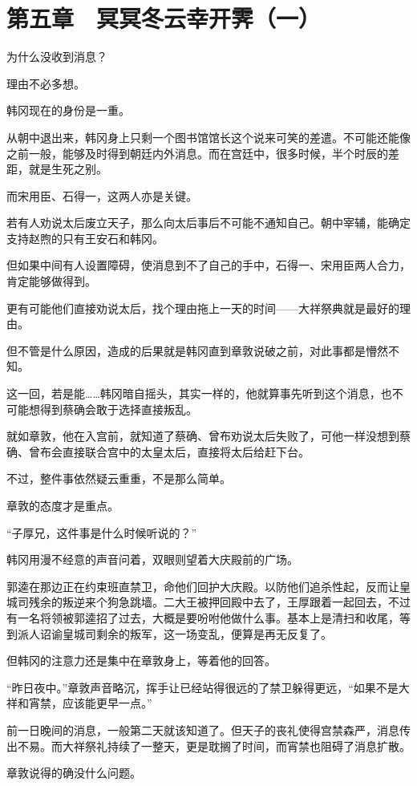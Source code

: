 \section{第五章　冥冥冬云幸开霁（一）}

为什么没收到消息？

理由不必多想。

韩冈现在的身份是一重。

从朝中退出来，韩冈身上只剩一个图书馆馆长这个说来可笑的差遣。不可能还能像之前一般，能够及时得到朝廷内外消息。而在宫廷中，很多时候，半个时辰的差距，就是生死之别。

而宋用臣、石得一，这两人亦是关键。

若有人劝说太后废立天子，那么向太后事后不可能不通知自己。朝中宰辅，能确定支持赵煦的只有王安石和韩冈。

但如果中间有人设置障碍，使消息到不了自己的手中，石得一、宋用臣两人合力，肯定能够做得到。

更有可能他们直接劝说太后，找个理由拖上一天的时间——大祥祭典就是最好的理由。

但不管是什么原因，造成的后果就是韩冈直到章敦说破之前，对此事都是懵然不知。

这一回，若是能……韩冈暗自摇头，其实一样的，他就算事先听到这个消息，也不可能想得到蔡确会敢于选择直接叛乱。

就如章敦，他在入宫前，就知道了蔡确、曾布劝说太后失败了，可他一样没想到蔡确、曾布会直接联合宫中的太皇太后，直接将太后给赶下台。

不过，整件事依然疑云重重，不是那么简单。

章敦的态度才是重点。

“子厚兄，这件事是什么时候听说的？”

韩冈用漫不经意的声音问着，双眼则望着大庆殿前的广场。

郭逵在那边正在约束班直禁卫，命他们回护大庆殿。以防他们追杀性起，反而让皇城司残余的叛逆来个狗急跳墙。二大王被押回殿中去了，王厚跟着一起回去，不过有一名将领被郭逵招了过去，大概是要吩咐他做什么事。基本上是清扫和收尾，等到派人诏谕皇城司剩余的叛军，这一场变乱，便算是再无反复了。

但韩冈的注意力还是集中在章敦身上，等着他的回答。

“昨日夜中。”章敦声音略沉，挥手让已经站得很远的了禁卫躲得更远，“如果不是大祥和宵禁，应该能更早一点。”

前一日晚间的消息，一般第二天就该知道了。但天子的丧礼使得宫禁森严，消息传出不易。而大祥祭礼持续了一整天，更是耽搁了时间，而宵禁也阻碍了消息扩散。

章敦说得的确没什么问题。

